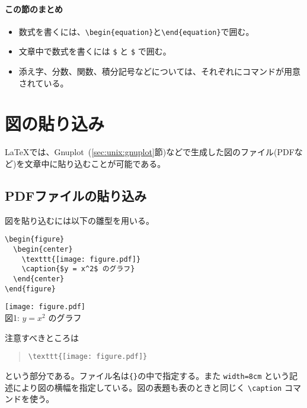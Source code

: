 \paragraph{この節のまとめ}

\begin{itemize}
\item 数式を書くには、\verb|\begin{equation}|と\verb|\end{equation}|で囲む。
\item 文章中で数式を書くには \texttt{\$} と \texttt{\$} で囲む。
\item 添え字、分数、関数、積分記号などについては、それぞれにコマンドが用意されている。
\end{itemize}

\section{図の貼り込み}
\label{sec:latex:picture}

\LaTeX では、Gnuplot~(\ref{sec:unix:gnuplot}節)などで生成した図のファイル(PDFなど)を文章中に貼り込むことが可能である。

\subsection{PDFファイルの貼り込み}
\label{sec:latex:include_pdf}

図を貼り込むには以下の雛型を用いる。
\begin{reidai}
\begin{verbatim}
\begin{figure}
  \begin{center}
    \texttt{[image: figure.pdf]}
    \caption{$y = x^2$ のグラフ}
  \end{center}
\end{figure}
\end{verbatim}
\end{reidai}
\vspace*{-1.5em}
\begin{kekka}
  \begin{center}
    \texttt{[image: figure.pdf]} \\
    図1: $y = x^2$ のグラフ
  \end{center}
\end{kekka} \noindent
注意すべきところは
\begin{quotation}
  \verb|\texttt{[image: figure.pdf]}|
\end{quotation}
という部分である。ファイル名は{\tt \{\}}の中で指定する。また \texttt{width=8cm} という記述により図の横幅を指定している。図の表題も表のときと同じく \verb|\caption| コマンドを使う。

